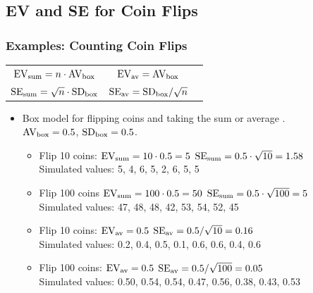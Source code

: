 \documentclass[t]{beamer}
\begin{document}
\subsection{EV and SE for Coin Flips}
\begin{frame}
\frametitle{Examples: Counting Coin Flips}

\footnotesize
 \begin{center}
\begin{tabular}{ccc}
{\color{blue}$\mbox{EV}_{\scriptsize\mbox{sum}} = n\cdot \mbox{AV}_{\scriptsize\mbox{box}}$} &\hspace{.5in}
{\color{darkgreen}$\mbox{EV}_{\scriptsize\mbox{av}} = \mbox{AV}_{\scriptsize\mbox{box}}$} \\[5pt]
{\color{blue}$\mbox{SE}_{\scriptsize\mbox{sum}} = \sqrt{n}\cdot \mbox{SD}_{\scriptsize\mbox{box}}$} &\hspace{.5in}
{\color{darkgreen}$\mbox{SE}_{\scriptsize\mbox{av}} = \mbox{SD}_{\scriptsize\mbox{box}}/\sqrt{n}$}
\end{tabular}
\end{center}

\begin{itemize}
\item Box model for flipping coins and taking the sum or average
.\\
$\mbox{AV}_{\mbox{\scriptsize box}} = 0.5$,
   $\mbox{SD}_{\mbox{\scriptsize box}} = 0.5$.
  \begin{itemize}
  \item<2-> \footnotesize {\color{blue}Flip 10 coins:  $\mbox{EV}_{\scriptsize\mbox{sum}} = 10\cdot 0.5 = 5$
     $\mbox{SE}_{\scriptsize\mbox{sum}} = 0.5\cdot \sqrt{10} = 1.58$}\\
   Simulated values: 5, 4, 6, 5, 2, 6, 5, 5\vspace{3pt}
%
\item<3-> {\color{blue}Flip 100 coins  $\mbox{EV}_{\scriptsize\mbox{sum}} = 100\cdot 0.5 = 50$
     $\mbox{SE}_{\scriptsize\mbox{sum}} = 0.5\cdot \sqrt{100} = 5$}\\
   Simulated values: 47, 48, 48, 42, 53, 54, 52, 45\vspace{5pt}
%
  \item<4-> \footnotesize {\color{darkgreen}Flip 10 coins:  $\mbox{EV}_{\scriptsize\mbox{av}} =0.5$
     $\mbox{SE}_{\scriptsize\mbox{av}} = 0.5/ \sqrt{10} = 0.16$}\\
   Simulated values: 0.2, 0.4, 0.5, 0.1, 0.6, 0.6, 0.4, 0.6\vspace{3pt}
  \item<5-> \footnotesize {\color{darkgreen}Flip 100 coins:  $\mbox{EV}_{\scriptsize\mbox{av}} =0.5$
     $\mbox{SE}_{\scriptsize\mbox{av}} = 0.5/ \sqrt{100} = 0.05$}\\
   Simulated values: 0.50, 0.54, 0.54, 0.47, 0.56, 0.38, 0.43, 0.53\vspace{3pt}
  \end{itemize}
\end{itemize}
\end{frame}
\end{document}
